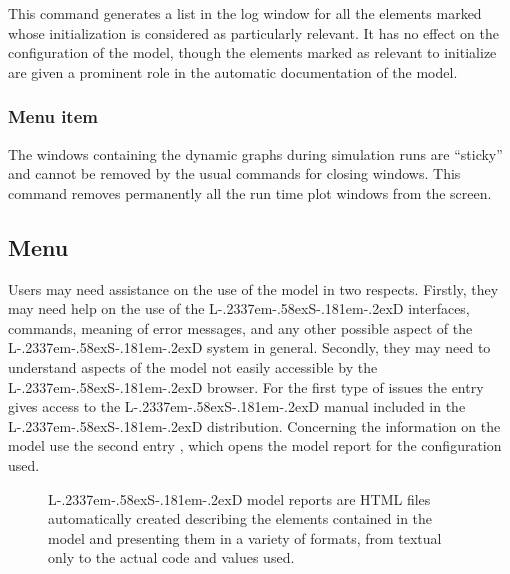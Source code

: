 \documentclass [11pt,a4paper] {book}
\def\LsD{{L\kern-.2337em\lower-.58ex\hbox{S}\kern-.181em\lower-.2ex\hbox{D}}\xspace}
\begin{document}
This command generates a list in the log window for all the elements marked whose initialization is considered as particularly relevant. It has no effect on the configuration of the model, though the elements marked as relevant  to initialize are given a prominent role in the automatic documentation of the model.

\subsubsection{Menu item  }

The windows containing the dynamic graphs during simulation runs are ``sticky'' and cannot be removed by the usual commands for closing windows. This command removes permanently all the run time plot windows from the screen.


\subsection{Menu }

Users may need assistance on the use of the model in two respects. Firstly, they may need help on the use of the \LsD interfaces, commands, meaning of error messages, and any other possible aspect of the \LsD system in general. Secondly, they may need to understand aspects of the model not easily accessible by the \LsD browser. For the first type of issues the entry \menu{\LsD help} gives access to the \LsD manual included in the \LsD distribution. Concerning the information on the model use the second entry , which opens the model report for the configuration used.

\begin{figure}[ht]
  \centering
  \caption{\LsD model reports are HTML files automatically created describing the elements contained in the model and presenting them in a variety of formats, from textual only to the actual code and values used.}
  \label{fig:ex_report}
\end{figure}
\end{document}

